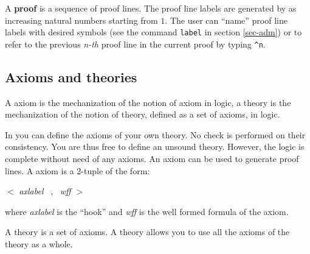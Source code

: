 A {\GF} {\bf proof} is a sequence of proof lines.
The proof line labels are generated by {\GF} as increasing natural numbers
starting from $1$.
The user can ``name'' proof line labels with desired {\GF} symbols (see the
command {\tt label} in section \ref{sec-adm}) or to refer to the previous {\em
n-th} proof line in the current proof by typing \verb+^n+.


\subsection{Axioms and theories}

A {\GF} axiom is the mechanization of the notion of axiom in logic, a {\GF}
theory is the mechanization of the notion of theory, defined as a set of axioms,
in logic.
 
In {\GF} you can define the axioms of your own theory.
No check is performed on their consistency.
You are thus free to define an unsound theory.
However, the {\GF} logic is complete without need of any axioms.  
An axiom can be used to generate proof lines. 
A {\GF} axiom is a 2-tuple of the form:

\begin{center}
	$<$ {\em axlabel} \ , \ {\em wff} $>$\\
\end{center}

where {\em axlabel} is the ``hook'' and {\em wff} is the well formed formula of
the axiom. 

A theory is a set of axioms.
A theory allows you to use all the axioms of the theory as a whole. 
